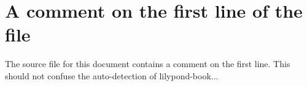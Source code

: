 \documentclass[a4paper, 12pt]{article}
\begin{document}
\section{A comment on the first line of the file}

The source file for this document contains a comment on the first line.
This should not confuse the auto-detection of lilypond-book...

{%
\parindent 0pt
\noindent
\ifx\preLilyPondExample \undefined
\else
  \expandafter\preLilyPondExample
\fi
\def\lilypondbook{}%

\ifx\postLilyPondExample \undefined
\else
  \expandafter\postLilyPondExample
\fi
}
\end{document}
